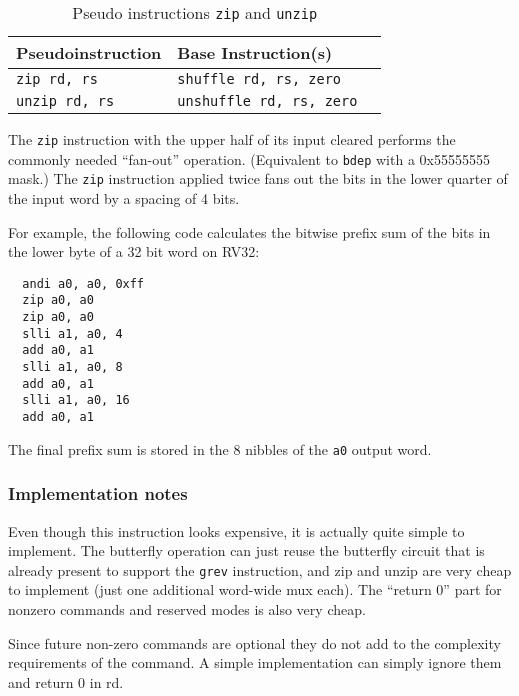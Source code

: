 \begin{table}[h]
\begin{small}
\begin{center}
\begin{tabular}{l l l}
Pseudoinstruction & Base Instruction(s) \\ \hline
{\tt zip rd, rs} & {\tt shuffle rd, rs, zero} \\
{\tt unzip rd, rs} & {\tt unshuffle rd, rs, zero} \\
\hline

\end{tabular}
\end{center}
\end{small}
\caption{Pseudo instructions {\tt zip} and {\tt unzip}}
\label{pseudos-zip-unzip}
\end{table}

The \texttt{zip} instruction with the upper half of its input cleared performs
the commonly needed ``fan-out'' operation. (Equivalent to {\tt bdep} with a
0x55555555 mask.) The \texttt{zip} instruction applied twice fans out the bits
in the lower quarter of the input word by a spacing of 4 bits.

For example, the following code calculates the bitwise prefix sum of the bits
in the lower byte of a 32 bit word on RV32:

\begin{verbatim}
  andi a0, a0, 0xff
  zip a0, a0
  zip a0, a0
  slli a1, a0, 4
  add a0, a1
  slli a1, a0, 8
  add a0, a1
  slli a1, a0, 16
  add a0, a1
\end{verbatim}

The final prefix sum is stored in the 8 nibbles of the {\tt a0} output word.

\subsubsection{Implementation notes}

Even though this instruction looks expensive, it is actually quite simple to
implement.  The butterfly operation can just reuse the butterfly circuit that
is already present to support the {\tt grev} instruction, and zip and unzip are
very cheap to implement (just one additional word-wide mux each). The ``return
0'' part for nonzero commands and reserved modes is also very cheap.

Since future non-zero commands are optional they do not add to the complexity
requirements of the command. A simple implementation can simply ignore them
and return 0 in rd.
